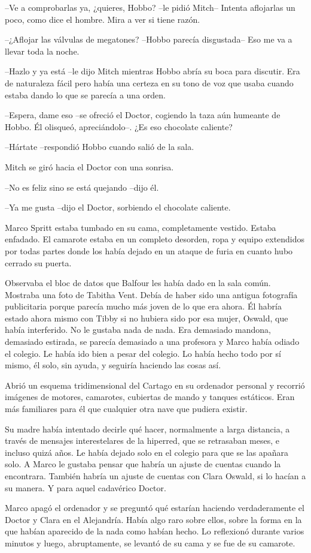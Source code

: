 {--Ve a comprobarlas ya, ¿quieres, Hobbo? --le pidió Mitch-- Intenta
aflojarlas un poco, como dice el hombre. Mira a ver si tiene razón.}

{--¿Aflojar las válvulas de megatones? --Hobbo parecía disgustada-- Eso
me va a llevar toda la noche.}

{--Hazlo y ya está --le dijo Mitch mientras Hobbo abría su boca para
 discutir. Era de naturaleza fácil pero había una certeza en su tono de
voz que usaba cuando estaba dando lo que se parecía a una orden.}

{--Espera, dame eso --se ofreció el Doctor, cogiendo la taza aún humeante
de Hobbo. Él olisqueó, apreciándolo--. ¿Es eso chocolate caliente?}

{--Hártate --respondió Hobbo cuando salió de la sala.}

{Mitch se giró hacia el Doctor con una sonrisa.}

{--No es feliz sino se está quejando --dijo él.}

{--Ya me gusta --dijo el Doctor, sorbiendo el chocolate
caliente.}

{Marco Spritt estaba tumbado en su cama,
 completamente vestido. Estaba enfadado. El camarote estaba en un
 completo desorden, ropa y equipo extendidos por todas partes donde los
había dejado en un ataque de furia en cuanto hubo cerrado su puerta.}

{Observaba el bloc de datos que Balfour les había dado en la sala común.
 Mostraba una foto de Tabitha Vent. Debía de haber sido una antigua
 fotografía publicitaria porque parecía mucho más joven de lo que era
 ahora. Él habría estado ahora mismo con Tibby si no hubiera sido por esa
 mujer, Oswald, que había interferido. No le gustaba nada de nada. Era
 demasiado mandona, demasiado estirada, se parecía demasiado a una
 profesora y Marco había odiado el colegio. Le había ido bien a pesar del
 colegio. Lo había hecho todo por sí mismo, él solo, sin ayuda, y
seguiría haciendo las cosas así.}

{Abrió un esquema tridimensional del Cartago en su ordenador personal y
 recorrió imágenes de motores, camarotes, cubiertas de mando y tanques
 estáticos. Eran más familiares para él que cualquier otra nave que
pudiera existir.}

{Su madre había intentado decirle qué hacer, normalmente a larga
 distancia, a través de mensajes interestelares de la hiperred, que se
 retrasaban meses, e incluso quizá años. Le había dejado solo en el
 colegio para que se las apañara solo. A Marco le gustaba pensar que
 habría un ajuste de cuentas cuando la encontrara. También habría un
 ajuste de cuentas con Clara Oswald, si lo hacían a su manera. Y para
aquel cadavérico Doctor.}

{Marco apagó el ordenador y se preguntó qué estarían haciendo
 verdaderamente el Doctor y Clara en el Alejandría. Había algo raro sobre
 ellos, sobre la forma en la que habían aparecido de la nada como habían
 hecho. Lo reflexionó durante varios minutos y luego, abruptamente, se
levantó de su cama y se fue de su camarote.}
